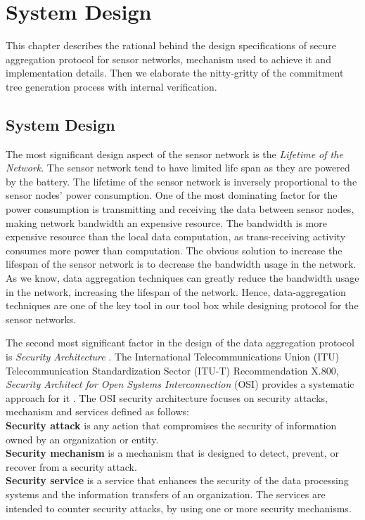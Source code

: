 \chapter{System Design} %
\label{cha:System Design}
	
	This chapter describes the rational behind the design specifications of secure aggregation protocol for sensor networks, mechanism used to achieve it and implementation details.
	Then we elaborate the nitty-gritty of the commitment tree generation process with internal verification.

	\section{System Design}

	The most significant design aspect of the sensor network is the \textit{Lifetime of the Network}.
	The sensor network tend to have limited life span as they are powered by the battery.
	The lifetime of the sensor network is inversely proportional to the sensor nodes' power consumption.
	One of the most dominating factor for the power consumption is transmitting and receiving the data between sensor nodes, making network bandwidth an expensive resource.
	The bandwidth is more expensive resource than the local data computation, as trans-receiving activity consumes more power than computation.
	The obvious solution to increase the lifespan of the sensor network is to decrease the bandwidth usage in the network.
	As we know, data aggregation techniques can greatly reduce the bandwidth usage in the network, increasing the lifespan of the network.
	Hence, data-aggregation techniques are one of the key tool in our tool box while designing protocol for the sensor networks.

	The second most significant factor in the design of the data aggregation protocol is \textit{Security Architecture }.
	The International Telecommunications Union (ITU) Telecommunication Standardization Sector (ITU-T) Recommendation X.800, \textit{Security Architect for Open Systems Interconnection} (OSI) provides a systematic approach for it \cite{stallings2008computer}.
	The OSI security architecture focuses on security attacks, mechanism and services defined as follows:\\
	\textbf{Security attack} is any action that compromises the security of information owned by an organization or entity.\\
	\textbf{Security mechanism} is a mechanism that is designed to detect, prevent, or recover from a security attack.\\
	\textbf{Security service} is a service that enhances the security of the data processing systems and the information transfers of an organization.
	The services are intended to counter security attacks, by using one or more security mechanisms.

